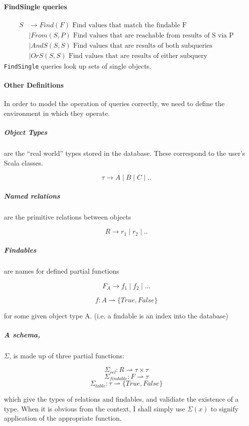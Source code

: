 \documentclass[12pt,a4paper,twoside,openright]{report}
\newcommand\codeName[1]{\texttt{#1}}
\let\oldparagraph\paragraph
\renewcommand{\paragraph}[1]{\oldparagraph{#1}\mbox{}}
\let\oldsubparagraph\subparagraph
\renewcommand{\subparagraph}[1]{\oldsubparagraph{#1}\mbox{}}
\begin{document}
\paragraph{FindSingle queries}
\begin{equation}
\label{SDefinition}
\begin{split}
S & \rightarrow Find(F) \mbox{ Find values that match the findable F}\\
&\mid From(S, P) \mbox{ Find values that are reachable from results of S via P}\\
&\mid AndS(S, S) \mbox{ Find values that are results of both subqueries}\\
&\mid OrS(S, S) \mbox{ Find values that are results of either subquery}
\end{split}
\end{equation} 
\codeName{FindSingle} queries look up sets of single objects.\\

\paragraph{Other Definitions}
In order to model the operation of queries correctly, we need to define the environment in which they operate.

\subparagraph{Object Types} are the ``real world'' types stored in the database. These correspond to the user's Scala classes.

\[ \tau \rightarrow A \mid B \mid C \mid .. \]

\subparagraph{Named relations} are the primitive relations between objects

\[R \rightarrow r_1 \mid r_2 \mid .. \]

\subparagraph{Findables} are names for defined partial functions

\[F_A \rightarrow f_1 \mid f_2 \mid ... \]

\[f \colon A \rightharpoonup \{True, False\} \]

for some given object type A. (i.e. a findable is an index into the database)

\subparagraph{A schema,}$\Sigma$, is made up of three partial functions:

\[\Sigma_{rel}\colon R \rightharpoonup \tau\times\tau \]
\[\Sigma_{findable}\colon F \rightharpoonup \tau \]
\[\Sigma_{table}\colon \tau \rightharpoonup \{True, False\} \]

which give the types of relations and findables, and validiate the existence of a type. When it is obvious from the context, I shall simply use $\Sigma(x)$ to signify application of the appropriate function.
 
\end{document}
